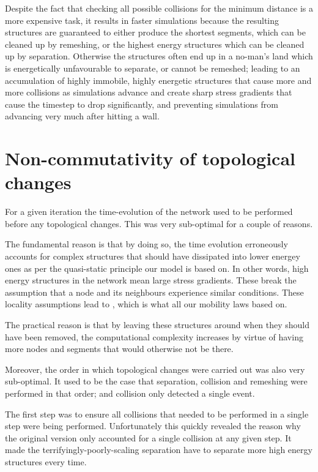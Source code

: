 Despite the fact that checking all possible collisions for the minimum distance is a more expensive task, it results in faster simulations because the resulting structures are guaranteed to either produce the shortest segments, which can be cleaned up by remeshing, or the highest energy structures which can be cleaned up by separation. Otherwise the structures often end up in a no-man's land which is energetically unfavourable to separate, or cannot be remeshed; leading to an accumulation of highly immobile, highly energetic structures that cause more and more collisions as simulations advance and create sharp stress gradients that cause the timestep to drop significantly, and preventing simulations from advancing very much after hitting a wall.

\section{Non-commutativity of topological changes}\label{s:nonCommutativity}

For a given iteration the time-evolution of the network used to be performed before any topological changes. This was very sub-optimal for a couple of reasons.

The fundamental reason is that by doing so, the time evolution erroneously accounts for complex structures that should have dissipated into lower energey ones as per the quasi-static principle our model is based on. In other words, high energy structures in the network mean large stress gradients. These break the assumption that a node and its neighbours experience similar conditions. These locality assumptions lead to \label{eq:nodeVel}, which is what all our mobility laws based on.

The practical reason is that by leaving these structures around when they should have been removed, the computational complexity increases by virtue of having more nodes and segments that would otherwise not be there.

Moreover, the order in which topological changes were carried out was also very sub-optimal. It used to be the case that separation, collision and remeshing were performed in that order; and collision only detected a single event.

The first step was to ensure all collisions that needed to be performed in a single step were being performed. Unfortunately this quickly revealed the reason why the original version only accounted for a single collision at any given step. It made the terrifyingly-poorly-scaling separation have to separate more high energy structures every time.

